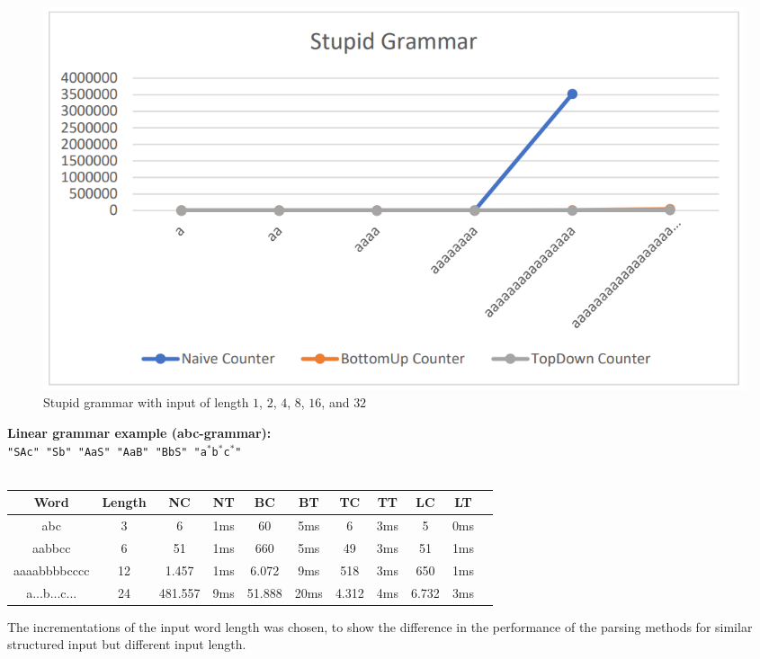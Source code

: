 \documentclass[a4paper, 11pt]{article}
\begin{document}
\begin{figure}[H]
\includegraphics[scale=0.5]{diagrams/SG_C.png}
\caption{Stupid grammar with input of length $1$, $2$, $4$, $8$, $16$,  and $32$}
\end{figure}



\textbf{Linear grammar example (abc-grammar):} \\
\texttt{"SAc" "Sb" "AaS" "AaB" "BbS" "a$^*$b$^*$c$^*$"}
\ \\ \\
\begin{small}
\begin{tabular}{|c|c||c|c||c|c||c|c||c|c|c|}
\hline
Word & Length & NC & NT & BC & BT & TC & TT & LC & LT \\
\hline
\hline
abc & 3 & 6 & 1ms & 60 & 5ms & 6 & 3ms & 5 & 0ms \\
\hline
aabbcc & 6 & 51 & 1ms & 660 & 5ms & 49 & 3ms & 51 & 1ms \\
\hline
aaaabbbbcccc & 12 & 1.457 & 1ms & 6.072 & 9ms & 518 & 3ms & 650 & 1ms \\
\hline
a...b...c... & 24 & 481.557 & 9ms & 51.888 & 20ms & 4.312 & 4ms & 6.732 & 3ms \\
\hline
\end{tabular}
\end{small}

The incrementations of the input word length was chosen, to show the difference in the performance of the parsing methods for similar structured input but different input length.







\end{document}
